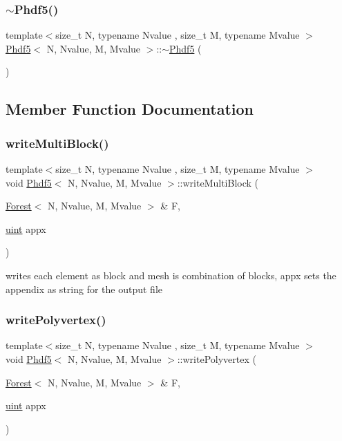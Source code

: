 \subsubsection{\texorpdfstring{$\sim$\+Phdf5()}{~Phdf5()}}
{\footnotesize\ttfamily template$<$size\+\_\+t N, typename Nvalue , size\+\_\+t M, typename Mvalue $>$ \\
\mbox{\hyperlink{classPhdf5}{Phdf5}}$<$ N, Nvalue, M, Mvalue $>$\+::$\sim$\mbox{\hyperlink{classPhdf5}{Phdf5}} (\begin{DoxyParamCaption}{ }\end{DoxyParamCaption})\hspace{0.3cm}{\ttfamily [inline]}}



\subsection{Member Function Documentation}
\mbox{\label{classPhdf5_aae8557e831c06005dd887d04073a171d}} 
\subsubsection{\texorpdfstring{write\+Multi\+Block()}{writeMultiBlock()}}
{\footnotesize\ttfamily template$<$size\+\_\+t N, typename Nvalue , size\+\_\+t M, typename Mvalue $>$ \\
void \mbox{\hyperlink{classPhdf5}{Phdf5}}$<$ N, Nvalue, M, Mvalue $>$\+::write\+Multi\+Block (\begin{DoxyParamCaption}\item[{\mbox{\hyperlink{classForest}{Forest}}$<$ N, Nvalue, M, Mvalue $>$ \&}]{F,  }\item[{\mbox{\hyperlink{definitions_8h_a69aa29b598b851b0640aa225a9e5d61d}{uint}}}]{appx }\end{DoxyParamCaption})}

writes each element as block and mesh is combination of blocks, appx sets the appendix as string for the output file \mbox{\label{classPhdf5_a09da9d5b8a098327ed178237532f99c9}} 
\subsubsection{\texorpdfstring{write\+Polyvertex()}{writePolyvertex()}}
{\footnotesize\ttfamily template$<$size\+\_\+t N, typename Nvalue , size\+\_\+t M, typename Mvalue $>$ \\
void \mbox{\hyperlink{classPhdf5}{Phdf5}}$<$ N, Nvalue, M, Mvalue $>$\+::write\+Polyvertex (\begin{DoxyParamCaption}\item[{\mbox{\hyperlink{classForest}{Forest}}$<$ N, Nvalue, M, Mvalue $>$ \&}]{F,  }\item[{\mbox{\hyperlink{definitions_8h_a69aa29b598b851b0640aa225a9e5d61d}{uint}}}]{appx }\end{DoxyParamCaption})}

